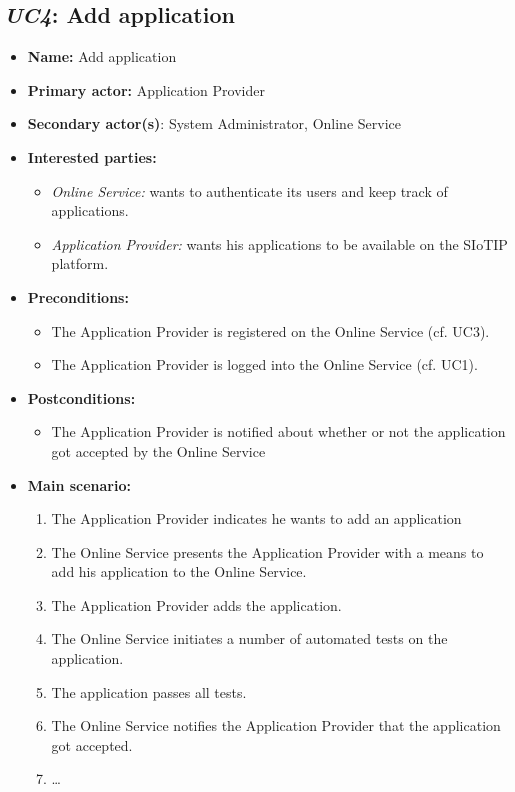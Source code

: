 \documentclass[english]{sareport}
\begin{document}
\subsection{\emph{UC4}: Add application}
\begin{itemize}
    \item \textbf{Name:} Add application
    \item \textbf{Primary actor:} Application Provider
    \item \textbf{Secondary actor(s)}: System Administrator, Online Service
    \item \textbf{Interested parties:} 
        \begin{itemize}
            \item \textit{Online Service:} wants to authenticate its users and keep track of applications.
            \item \textit{Application Provider:} wants his applications to be available on the SIoTIP platform.
        \end{itemize}

    \item \textbf{Preconditions:}
        \begin{itemize}
            \item The Application Provider is registered on the Online Service (cf. UC3).
            \item The Application Provider is logged into the Online Service (cf. UC1).
        \end{itemize}

    \item \textbf{Postconditions:}
        \begin{itemize}
            \item The Application Provider is notified about whether or not the application got accepted by the Online Service
        \end{itemize}
        
    \item \textbf{Main scenario:} 
    \begin{enumerate}
       \item The Application Provider indicates he wants to add an application
       \item The Online Service presents the Application Provider with a means to add his application to the Online Service.
       \item The Application Provider adds the application.
	\item The Online Service initiates a number of automated tests on the application.
	\item The application passes all tests.
	\item The Online Service notifies the Application Provider that the application got accepted.
       \item \ldots
    \end{enumerate}


\end{itemize}
\end{document}
